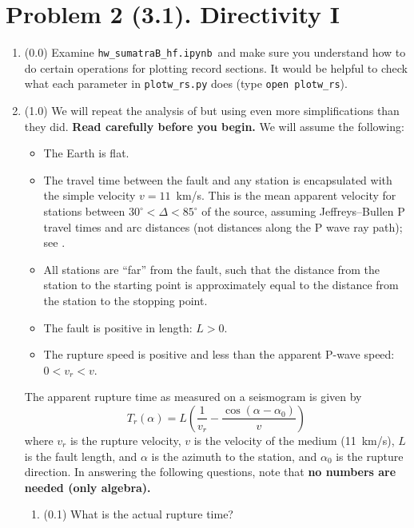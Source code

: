 \documentclass[11pt,titlepage,fleqn]{article}
\newcommand{\tfilehf}{{\tt hw\_sumatraB\_hf.ipynb}}
\begin{document}

\pagebreak
\section*{Problem 2 (3.1). Directivity I}

\begin{enumerate}
\item (0.0) Examine \tfilehf\ and make sure you understand how to do certain operations for plotting record sections. It would be helpful to check what each parameter in \verb+plotw_rs.py+ does (type \verb+open plotw_rs+).

\item (1.0) We will repeat the analysis of \citet{Ni2005} but using even more simplifications than they did. {\bf Read \citet{Ni2005} carefully before you begin.} We will assume the following:
%
\begin{itemize}
\item The Earth is flat.
\item The travel time between the fault and any station is encapsulated with the simple velocity $v = 11$~km/s. This is the mean apparent velocity for stations between $30^\circ < \Delta < 85^\circ$ of the source, assuming Jeffreys--Bullen P travel times and arc distances (not distances along the P wave ray path); see .
\item All stations are ``far'' from the fault, such that the distance from the station to the starting point is approximately equal to the distance from the station to the stopping point.
\item The fault is positive in length: $L > 0$.
\item The rupture speed is positive and less than the apparent P-wave speed: $0 < v_r < v$.
\end{itemize}
%
The apparent rupture time as measured on a seismogram is given by \citep[][Section 4.3.2]{SteinWysession}
%
\begin{equation}
T_r(\alpha) = L\left(\frac{1}{v_r} - \frac{\cos(\alpha-\alpha_0)}{v}\right)
\label{Tr}
\end{equation}
%
where $v_r$ is the rupture velocity, $v$ is the velocity of the medium (11~km/s), $L$ is the fault length, and $\alpha$ is the azimuth to the station, and $\alpha_0$ is the rupture direction. In answering the following questions, note that {\bf no numbers are needed (only algebra).}
%
\begin{enumerate}
\item (0.1) What is the actual rupture time?

\end{enumerate}
\end{enumerate}
\end{document}

